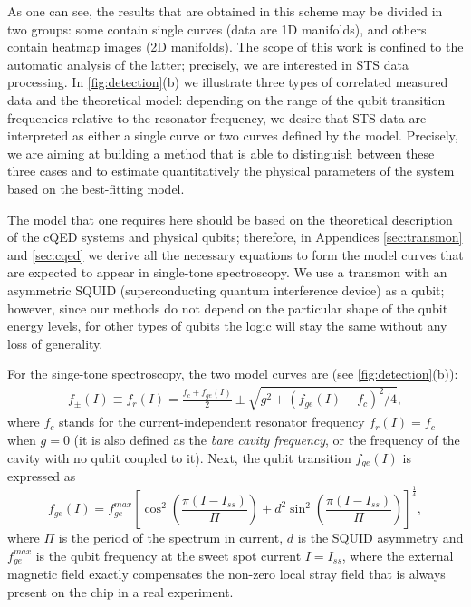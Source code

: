 \documentclass[%
 aip,
 draft,
 amsmath,amssymb,
 reprint,%
]{revtex4-1}
\begin{document}
As one can see, the results that are obtained in this scheme may be divided in two groups: some contain single curves (data are 1D manifolds), and others contain heatmap images (2D manifolds). The scope of this work is confined to the automatic analysis of the latter; precisely, we are interested in STS data processing. In \autoref{fig:detection}(b) we illustrate three types of correlated measured data and the theoretical model: depending on the range of the qubit transition frequencies relative to the resonator frequency, we desire that STS data are interpreted as either a single curve or two curves defined by the model. Precisely, we are aiming at building a method that is able to distinguish between these three cases and to estimate quantitatively the physical parameters of the system based on the best-fitting model. 

The model that one requires here should be based on the theoretical description of the cQED systems and physical qubits; therefore, in Appendices \ref{sec:transmon} and \ref{sec:cqed} we derive all the necessary equations to form the model curves that are expected to appear in single-tone spectroscopy. We use a transmon\cite{koch2007} with an asymmetric SQUID (superconducting quantum interference device) as a qubit; however, since our methods do not depend on the particular shape of the qubit energy levels, for other types of qubits the logic will stay the same without any loss of generality.

For the singe-tone spectroscopy, the two model curves are (see \autoref{fig:detection}(b)):
\begin{align}
f_\pm(I) \equiv f_r(I) = \frac{f_c + f_{ge}(I)}{2} \pm \sqrt{g^2+(f_{ge}(I) - f_c)^2/4},\label{eq:f_r}
\end{align}
where $f_c$ stands for the current-independent resonator frequency $f_r(I) = f_c$ when $g=0$ (it is also defined as the \textit{bare cavity frequency}, or the frequency of the cavity with no qubit coupled to it). Next, the qubit transition $f_{ge}(I)$ is expressed as
\begin{equation}
f_{ge}(I) = f_{ge}^{max} \left[\cos^2\left(\frac{\pi(I-I_{ss})}{\Pi}\right)+d^2 \sin^2 \left(\frac{\pi(I-I_{ss})}{\Pi}\right)\right]^\frac{1}{4},
\label{eq:tr_spectrum}
\end{equation}
where $\Pi$ is the period of the spectrum in current, $d$ is the SQUID asymmetry and $f_{ge}^{max}$ is the qubit frequency at the sweet spot current $I = I_{ss}$, where the external magnetic field exactly compensates the non-zero local stray field that is always present on the chip in a real experiment.
\end{document}
